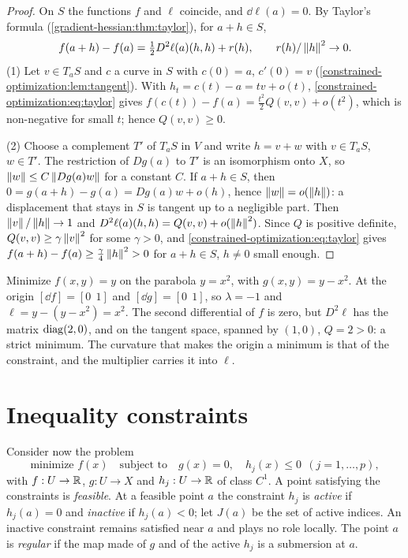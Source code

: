 \begin{notechapter}
\begin{proof}
On $S$ the functions $f$ and $\ell$ coincide, and $\dd\ell(a) = 0$. By
Taylor's formula (\cref{gradient-hessian:thm:taylor}), for $a + h\in S$,
\begin{equation}\label{constrained-optimization:eq:taylor}
  f(a + h) - f(a) = \tfrac12D^2\ell(a)(h, h) + r(h),
  \qquad r(h)/\left\|h\right\|^2\to0 .
\end{equation}
(1) Let $v\in T_aS$ and $c$ a curve in $S$ with $c(0) = a$, $c'(0) = v$
(\cref{constrained-optimization:lem:tangent}). With
$h_t = c(t) - a = tv + o(t)$,
\eqref{constrained-optimization:eq:taylor} gives
$f(c(t)) - f(a) = \frac{t^2}2Q(v, v) + o(t^2)$, which is non-negative for
small $t$; hence $Q(v, v)\geq0$.

(2) Choose a complement $T'$ of $T_aS$ in $V$ and write $h = v + w$ with
$v\in T_aS$, $w\in T'$. The restriction of $Dg(a)$ to $T'$ is an
isomorphism onto $X$, so $\left\|w\right\|\leq C\left\|Dg(a)w\right\|$ for a constant $C$.
If $a + h\in S$, then
$0 = g(a + h) - g(a) = Dg(a)w + o(h)$, hence $\left\|w\right\| = o(\left\|h\right\|)$: a
displacement that stays in $S$ is tangent up to a negligible part. Then
$\left\|v\right\|/\left\|h\right\|\to1$ and
$D^2\ell(a)(h, h) = Q(v, v) + o(\left\|h\right\|^2)$. Since $Q$ is positive
definite, $Q(v, v)\geq\gamma\left\|v\right\|^2$ for some $\gamma > 0$, and
\eqref{constrained-optimization:eq:taylor} gives
$f(a + h) - f(a)\geq\frac\gamma4\left\|h\right\|^2 > 0$ for $a + h\in S$,
$h\neq0$ small enough.
\end{proof}

\begin{example}\label{constrained-optimization:ex:second}
Minimize $f(x, y) = y$ on the parabola $y = x^2$, with
$g(x, y) = y - x^2$. At the origin $[\dd f] = [0\ \ 1]$ and
$[\dd g] = [0\ \ 1]$, so $\lambda = -1$ and
$\ell = y - (y - x^2) = x^2$. The second differential of $f$ is zero, but
$D^2\ell$ has the matrix $\operatorname{diag}(2, 0)$, and on the tangent space, spanned
by $(1, 0)$, $Q = 2 > 0$: a strict minimum. The curvature that makes the
origin a minimum is that of the constraint, and the multiplier carries
it into $\ell$.
\end{example}

\section{Inequality constraints}\label{constrained-optimization:sec:kkt}

Consider now the problem
\begin{equation}\label{constrained-optimization:eq:problem}
  \text{minimize } f(x)
  \quad\text{subject to}\quad g(x) = 0,\quad
  h_j(x)\leq0\ \ (j = 1,\dots,p) ,
\end{equation}
with $f:U\to\mathbb{R}$, $g:U\to X$ and $h_j:U\to\mathbb{R}$ of class $C^1$. A point satisfying
the constraints is \emph{feasible}. At a feasible point $a$ the
constraint $h_j$ is \emph{active} if $h_j(a) = 0$ and \emph{inactive} if
$h_j(a) < 0$; let $J(a)$ be the set of active indices. An inactive
constraint remains satisfied near $a$ and plays no role locally. The
point $a$ is \emph{regular} if the map made of $g$ and of the active
$h_j$ is a submersion at $a$.


\end{notechapter}

